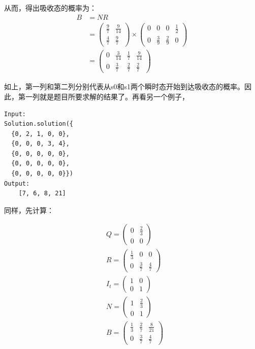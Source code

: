 \documentclass[12pt]{article}
\begin{document}
从而，得出吸收态的概率为：
\begin{align}
B &= NR \\
  &= \begin{pmatrix} \frac{9}{7} & \frac{9}{14} \\ \frac{4}{7} & \frac{9}{7} \end{pmatrix} \times \begin{pmatrix} 0 & 0 & 0 & \frac{1}{2} \\ 0 & \frac{3}{9}  & \frac{2}{9} & 0\end{pmatrix} \\
  & = \begin{pmatrix} 0 & \frac{3}{14} & \frac{1}{7} & \frac{9}{14} \\ 0 & \frac{3}{7} & \frac{2}{7} & \frac{2}{7}\end{pmatrix}
\end{align}

如上，第一列和第二列分别代表从s0和s1两个瞬时态开始到达吸收态的概率。因此，第一列就是题目所要求解的结果了。再看另一个例子，

\begin{verbatim}
Input:
Solution.solution({
  {0, 2, 1, 0, 0}, 
  {0, 0, 0, 3, 4}, 
  {0, 0, 0, 0, 0}, 
  {0, 0, 0, 0, 0}, 
  {0, 0, 0, 0, 0}})
Output:
    [7, 6, 8, 21]
\end{verbatim}

同样，先计算：

\begin{align}
& Q=\begin{pmatrix} 0 & \frac{2}{3} \\ 0 & 0 \end{pmatrix} \\
& R=\begin{pmatrix} \frac{1}{3} & 0 & 0 \\ 0 & \frac{3}{7}  & \frac{4}{7}\end{pmatrix} \\
& I_{t} = \begin{pmatrix} 1 & 0 \\ 0 & 1 \end{pmatrix} \\
& N = \begin{pmatrix} 1 & \frac{2}{3} \\ 0 & 1 \end{pmatrix} \\
& B = \begin{pmatrix} \frac{1}{3} & \frac{2}{7} & \frac{8}{21} \\ 0 & \frac{3}{7} & \frac{4}{7} \end{pmatrix} 
\end{align}
\end{document}
